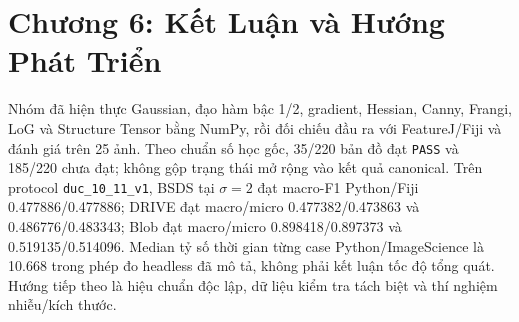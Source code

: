 \documentclass[conference]{IEEEtran}
\begin{document}

\section{Chương 6: Kết Luận và Hướng Phát Triển}
Nhóm đã hiện thực Gaussian, đạo hàm bậc 1/2, gradient, Hessian, Canny, Frangi, LoG và Structure Tensor bằng NumPy, rồi đối chiếu đầu ra với FeatureJ/Fiji và đánh giá trên 25 ảnh. Theo chuẩn số học gốc, 35/220 bản đồ đạt \texttt{PASS} và 185/220 chưa đạt; không gộp trạng thái mở rộng vào kết quả canonical. Trên protocol \texttt{duc\_10\_11\_v1}, BSDS tại $\sigma=2$ đạt macro-F1 Python/Fiji 0.477886/0.477886; DRIVE đạt macro/micro 0.477382/0.473863 và 0.486776/0.483343; Blob đạt macro/micro 0.898418/0.897373 và 0.519135/0.514096. Median tỷ số thời gian từng case Python/ImageScience là 10.668 trong phép đo headless đã mô tả, không phải kết luận tốc độ tổng quát. Hướng tiếp theo là hiệu chuẩn độc lập, dữ liệu kiểm tra tách biệt và thí nghiệm nhiễu/kích thước.
\clearpage


\clearpage


\end{document}
